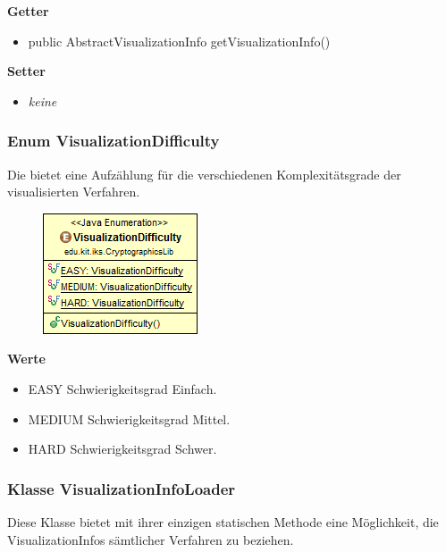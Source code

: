 \documentclass{article}
\begin{document}
      \textbf{Getter}
      \begin{itemize}
		\item public AbstractVisualizationInfo getVisualizationInfo()
      \end{itemize}
      
      \textbf{Setter}
      \begin{itemize}
        \item \textit{keine}
      \end{itemize}
	
	\subsubsection{Enum VisualizationDifficulty}
	  Die bietet eine Aufzählung für die verschiedenen Komplexitätsgrade der visualisierten Verfahren.
	
      \begin{figure}[H]
        \centering
        \includegraphics{resources/edu-kit-iks-CryptographicsLib-VisualizationDifficulty}
      \end{figure}

      \textbf{Werte}
      \begin{itemize}
        \item EASY \newline
          Schwierigkeitsgrad \glqq Einfach\grqq.
        \item MEDIUM \newline
          Schwierigkeitsgrad \glqq Mittel\grqq.
        \item HARD \newline
          Schwierigkeitsgrad \glqq Schwer\grqq.
      \end{itemize}
	
	\subsubsection{Klasse VisualizationInfoLoader}
	  Diese Klasse bietet mit ihrer einzigen statischen Methode eine Möglichkeit, 
	  die VisualizationInfos sämtlicher Verfahren zu beziehen.
	
\end{document}
